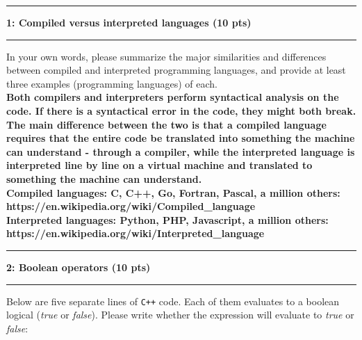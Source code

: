 \documentclass[11pt]{article}
\newcommand\question[2]{\vspace{.25in}\hrule\textbf{#1: #2}\vspace{.5em}\hrule\vspace{.10in}}
\begin{document}
\raggedright
\newcommand\Page{\page  / \lastPage}
\newcommand\page{1}
\newcommand\qN[2]{\Large {#1} \small{#2} \normalsize}

\newcommand\dueDate{\today}
\newcommand\hwnum{2}
\newcommand\ExNum{}

\newcommand\lastPage{3}

\lhead{\large Homework \hwnum }
\rhead{\rightHead}
\newcommand\rightHead{\large Due Sep 16, 2020}

\question{1}{Compiled versus interpreted languages (10 pts)}
In your own words, please summarize the major similarities and differences
between compiled and interpreted programming languages, and provide at least
three examples (programming languages) of each. \\[.5cm]

\textbf{Both compilers and interpreters perform syntactical analysis on the code. If there is a syntactical error in the code, they might both break. The main difference between the two is that a compiled language requires that the entire code be translated into something the machine can understand - through a compiler, while the interpreted language is interpreted line by line on a virtual machine and translated to something the machine can understand.  \\
\vspace{8pt}
Compiled languages: C, C++, Go, Fortran, Pascal, a million others: https://en.wikipedia.org/wiki/Compiled\_language\\
Interpreted languages: Python, PHP, Javascript, a million others: https://en.wikipedia.org/wiki/Interpreted\_language}

\question{2}{Boolean operators (10 pts)}
Below are five separate lines of \texttt{C++} code. Each of them evaluates to a
boolean logical (\textit{true} or \textit{false}). Please write whether the expression will
evaluate to \textit{true} or \textit{false}:
\begin{figure}[H]
    \center
\end{figure}
\end{document}

